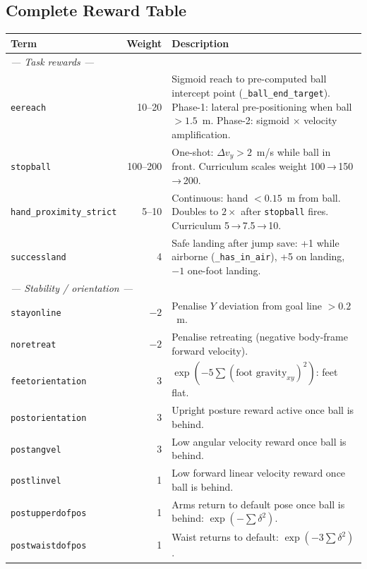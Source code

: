 \documentclass[11pt,a4paper]{article}
\begin{document}
\subsection{Complete Reward Table}
\label{subsec:rewards}

\begin{longtable}{p{3.5cm} r p{8.0cm}}
\toprule
\textbf{Term} & \textbf{Weight} & \textbf{Description} \\
\midrule
\endhead
\multicolumn{3}{l}{\textit{--- Task rewards ---}} \\[2pt]
\texttt{eereach}            & 10--20 & Sigmoid reach to pre-computed ball intercept point (\texttt{\_ball\_end\_target}). Phase-1: lateral pre-positioning when ball $> 1.5$~m. Phase-2: sigmoid $\times$ velocity amplification. \\[4pt]
\texttt{stopball}           & 100--200 & One-shot: $\Delta v_y > 2$~m/s while ball in front. Curriculum scales weight 100\,→\,150\,→\,200. \\[4pt]
\texttt{hand\_proximity\_strict} & 5--10 & Continuous: hand $< 0.15$~m from ball. Doubles to $2\times$ after \texttt{stopball} fires. Curriculum 5\,→\,7.5\,→\,10. \\[4pt]
\texttt{successland}        & 4 & Safe landing after jump save: +1 while airborne (\texttt{\_has\_in\_air}), +5 on landing, $-1$ one-foot landing. \\[4pt]
\midrule
\multicolumn{3}{l}{\textit{--- Stability / orientation ---}} \\[2pt]
\texttt{stayonline}         & $-2$ & Penalise $Y$ deviation from goal line $> 0.2$~m. \\[4pt]
\texttt{noretreat}          & $-2$ & Penalise retreating (negative body-frame forward velocity). \\[4pt]
\texttt{feetorientation}    & 3 & $\exp(-5 \sum (\text{foot gravity}_{xy})^2)$: feet flat. \\[4pt]
\texttt{postorientation}    & 3 & Upright posture reward active once ball is behind. \\[4pt]
\texttt{postangvel}         & 3 & Low angular velocity reward once ball is behind. \\[4pt]
\texttt{postlinvel}         & 1 & Low forward linear velocity reward once ball is behind. \\[4pt]
\texttt{postupperdofpos}    & 1 & Arms return to default pose once ball is behind: $\exp(-\sum\delta^2)$. \\[4pt]
\texttt{postwaistdofpos}    & 1 & Waist returns to default: $\exp(-3\sum\delta^2)$. \\[4pt]

\end{longtable}
\end{document}
